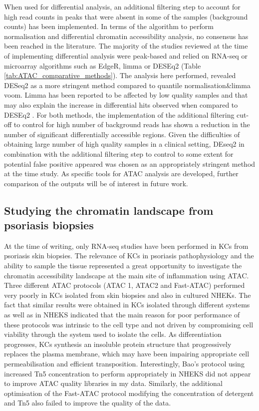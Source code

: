 When used for differential analysis, an additional filtering step to account for high read counts in peaks that were absent in some of the samples (background counts) has been implemented. In terms of the algorithm to perform normalisation and differential chromatin accessibility analysis, no consensus has been reached in the literature. The majority of the studies reviewed at the time of implementing differential analysis were peak-based and relied on RNA-seq or microarray algorithms such as EdgeR, limma or DESEq2 (Table \ref{tab:ATAC_comparative_methods}). The analysis here performed, revealed DESeq2 as a more stringent method compared to quantile normalisation\&limma voom. Limma has been reported to be affected by low quality samples and that may also explain the increase in differential hits observed when compared to DESEq2 \parencite{Alasoo2018}. For both methods, the implementation of the additional filtering cut-off to control for high number of background reads has shown a reduction in the number of significant differentially accessible regions. Given the difficulties of obtaining large number of high quality samples in a clinical setting, DEseq2 in combination with the additional filtering step to control to some extent for potential false positive appeared was chosen as an appropriately stringent method at the time study. As specific tools for ATAC analysis are developed, further comparison of the outputs will be of interest in future work.


\subsection{Studying the chromatin landscape from psoriasis biopsies}
At the time of writing, only RNA-seq studies have been performed in KCs from psoriasis skin biopsies. The relevance of KCs in psoriasis pathophysiology and the ability to sample the tissue represented a great opportunity to investigate the chromatin accessibility landscape at the main site of inflammation using ATAC. Three different ATAC protocols (ATAC 1, ATAC2 and Fast-ATAC) performed very poorly in KCs isolated from skin biopsies and also in cultured NHEKs. The fact that similar results were obtained in KCs isolated through different systems as well as in NHEKS indicated that the main reason for poor performance of these protocols was intrinsic to the cell type and not driven by compromising cell viability through the system used to isolate the cells. As differentiation progresses, KCs synthesis an insoluble protein structure that progressively replaces the plasma membrane, which may have been impairing appropriate cell permeabilisation and efficient transposition. Interestingly, Bao's protocol using increased Tn5 concentration to perform appropriately in NHEKS did not appear to improve ATAC quality libraries in my data. Similarly, the additional optimisation of the Fast-ATAC protocol modifying the concentration of detergent and Tn5 also failed to improve the quality of the data.

